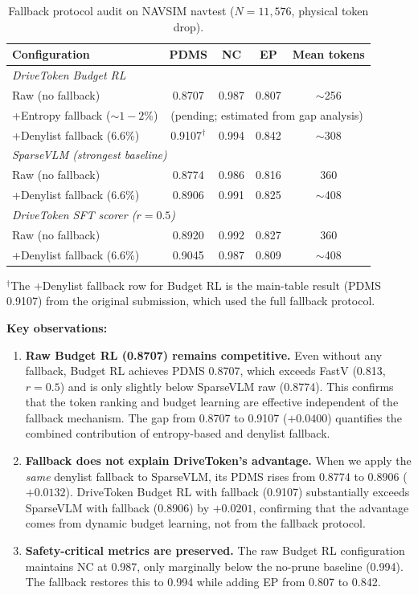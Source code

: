 \documentclass[letterpaper]{article}
\begin{document}
\begin{table}[h]
\centering
\caption{Fallback protocol audit on NAVSIM navtest ($N{=}11{,}576$, physical token drop).}
\label{tab:fallback_audit}
\small
\begin{tabular}{@{}lcccc@{}}
\toprule
Configuration & PDMS & NC & EP & Mean tokens \\
\midrule
\multicolumn{5}{l}{\emph{DriveToken Budget RL}} \\
Raw (no fallback)                 & 0.8707 & 0.987 & 0.807 & $\sim$256 \\
+Entropy fallback (${\sim}1{-}2\%$) & \multicolumn{4}{c}{(pending; estimated from gap analysis)} \\
+Denylist fallback (6.6\%)        & 0.9107$^\dagger$ & 0.994 & 0.842 & $\sim$308 \\
\midrule
\multicolumn{5}{l}{\emph{SparseVLM (strongest baseline)}} \\
Raw (no fallback)                 & 0.8774 & 0.986 & 0.816 & 360 \\
+Denylist fallback (6.6\%)        & 0.8906 & 0.991 & 0.825 & $\sim$408 \\
\midrule
\multicolumn{5}{l}{\emph{DriveToken SFT scorer ($r{=}0.5$)}} \\
Raw (no fallback)                 & 0.8920 & 0.992 & 0.827 & 360 \\
+Denylist fallback (6.6\%)        & 0.9045 & 0.987 & 0.809 & $\sim$408 \\
\bottomrule
\end{tabular}
\end{table}

\noindent$^\dagger$The +Denylist fallback row for Budget RL is the main-table result (PDMS 0.9107)
from the original submission, which used the full fallback protocol.

\medskip
\noindent\textbf{Key observations:}
\begin{enumerate}
  \item \textbf{Raw Budget RL (0.8707) remains competitive.} Even without any fallback, Budget RL
    achieves PDMS 0.8707, which exceeds FastV (0.813, $r{=}0.5$) and is only slightly below
    SparseVLM raw (0.8774). This confirms that the token ranking and budget learning are effective
    independent of the fallback mechanism. The gap from 0.8707 to 0.9107 ($+0.0400$) quantifies
    the combined contribution of entropy-based and denylist fallback.
  \item \textbf{Fallback does not explain DriveToken's advantage.} When we apply the \emph{same}
    denylist fallback to SparseVLM, its PDMS rises from 0.8774 to 0.8906 ($+0.0132$). DriveToken
    Budget RL with fallback (0.9107) substantially exceeds SparseVLM with fallback (0.8906) by
    $+0.0201$, confirming that the advantage comes from dynamic budget learning, not from the
    fallback protocol.
  \item \textbf{Safety-critical metrics are preserved.} The raw Budget RL configuration maintains
    NC at 0.987, only marginally below the no-prune baseline (0.994). The fallback restores this
    to 0.994 while adding EP from 0.807 to 0.842.
\end{enumerate}
\end{document}
